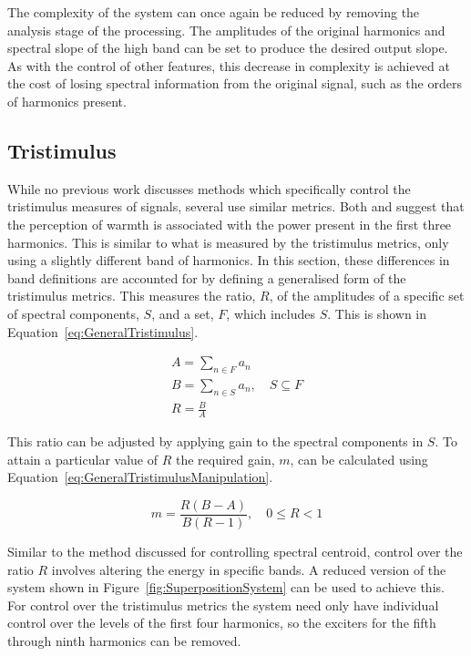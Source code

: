 		The complexity of the system can once again be reduced by removing the analysis stage of the processing.
		The amplitudes of the original harmonics and spectral slope of the high band can be set to produce the
		desired output slope. As with the control of other features, this decrease in complexity is achieved at the
		cost of losing spectral information from the original signal, such as the orders of harmonics present.

	\subsection{Tristimulus}
	\label{sec:FeatureControl-Parameterisation-Tristimulus}
		While no previous work discusses methods which specifically control the tristimulus measures of signals,
		several use similar metrics. Both \cite{williams2010perceptually} and \cite{zacharakis2011an} suggest that
		the perception of warmth is associated with the power present in the first three harmonics. This is similar
		to what is measured by the tristimulus metrics, only using a slightly different band of harmonics. In this
		section, these differences in band definitions are accounted for by defining a  generalised form of the
		tristimulus metrics. This measures the ratio, $R$, of the amplitudes of a specific set of spectral
		components, $S$, and a set, $F$, which includes $S$. This is shown in Equation~\ref{eq:GeneralTristimulus}.

		\begin{gather}
			A = \sum_{n \in F} a_{n} \nonumber \\
			B = \sum_{n \in S} a_{n}, \quad S \subseteq F \nonumber \\
			R = \frac{B}{A}
			\label{eq:GeneralTristimulus}
		\end{gather}

		This ratio can be adjusted by applying gain to the spectral components in $S$. To attain a particular value
		of $R$ the required gain, $m$, can be calculated using Equation~\ref{eq:GeneralTristimulusManipulation}.

		\begin{equation}
			m = \frac{R(B - A)}{B(R - 1)}, \quad 0 \leq R < 1
			\label{eq:GeneralTristimulusManipulation}
		\end{equation}

		Similar to the method discussed for controlling spectral centroid, control over the ratio $R$ involves
		altering the energy in specific bands. A reduced version of the system shown in
		Figure~\ref{fig:SuperpositionSystem} can be used to achieve this. For control over the tristimulus metrics
		the system need only have individual control over the levels of the first four harmonics, so the exciters
		for the fifth through ninth harmonics can be removed.

